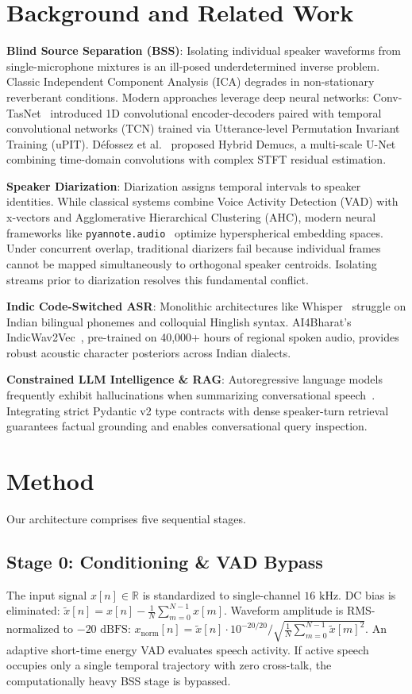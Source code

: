 \documentclass[12pt,a4paper,twocolumn]{article}
\begin{document}
\section{Background and Related Work}
\textbf{Blind Source Separation (BSS)}: Isolating individual speaker waveforms from single-microphone mixtures is an ill-posed underdetermined inverse problem. Classic Independent Component Analysis (ICA) degrades in non-stationary reverberant conditions. Modern approaches leverage deep neural networks: Conv-TasNet~\cite{luo2019convtasnet} introduced 1D convolutional encoder-decoders paired with temporal convolutional networks (TCN) trained via Utterance-level Permutation Invariant Training (uPIT). Défossez et al.~\cite{defossez2021demucs} proposed Hybrid Demucs, a multi-scale U-Net combining time-domain convolutions with complex STFT residual estimation.

\textbf{Speaker Diarization}: Diarization assigns temporal intervals to speaker identities. While classical systems combine Voice Activity Detection (VAD) with x-vectors and Agglomerative Hierarchical Clustering (AHC), modern neural frameworks like \texttt{pyannote.audio}~\cite{bredin2020pyannote} optimize hyperspherical embedding spaces. Under concurrent overlap, traditional diarizers fail because individual frames cannot be mapped simultaneously to orthogonal speaker centroids. Isolating streams prior to diarization resolves this fundamental conflict.

\textbf{Indic Code-Switched ASR}: Monolithic architectures like Whisper~\cite{radford2023whisper} struggle on Indian bilingual phonemes and colloquial Hinglish syntax. AI4Bharat's IndicWav2Vec~\cite{javed2022indicwav2vec}, pre-trained on 40,000+ hours of regional spoken audio, provides robust acoustic character posteriors across Indian dialects.

\textbf{Constrained LLM Intelligence \& RAG}: Autoregressive language models frequently exhibit hallucinations when summarizing conversational speech~\cite{russell2021aima}. Integrating strict Pydantic v2 type contracts with dense speaker-turn retrieval guarantees factual grounding and enables conversational query inspection.

\section{Method}
Our architecture comprises five sequential stages.

\subsection{Stage 0: Conditioning \& VAD Bypass}
The input signal $x[n] \in \mathbb{R}$ is standardized to single-channel $16\text{ kHz}$. DC bias is eliminated: $\tilde{x}[n] = x[n] - \frac{1}{N}\sum_{m=0}^{N-1} x[m]$. Waveform amplitude is RMS-normalized to $-20\text{ dBFS}$:
$x_{\text{norm}}[n] = \tilde{x}[n] \cdot 10^{-20/20} / \sqrt{\frac{1}{N}\sum_{m=0}^{N-1} \tilde{x}[m]^2}$.
An adaptive short-time energy VAD evaluates speech activity. If active speech occupies only a single temporal trajectory with zero cross-talk, the computationally heavy BSS stage is bypassed.
\end{document}
